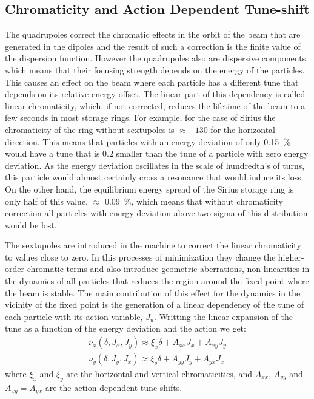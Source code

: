 \documentclass[
	12pt,				%
	openright,			%
	oneside,			%
	a4paper,		%
	chapter=TITLE,		%
	section=TITLE,		%
    brazil,				%
	english,			%
	sumario=tradicional,
	]{abntex2}
\begin{document}
    \subsection{Chromaticity and Action Dependent Tune-shift}

	The quadrupoles correct the chromatic effects in the orbit of the beam that are generated in the dipoles and the result of such a correction is the finite value of the dispersion function. However the quadrupoles also are dispersive components, which means that their focusing strength depends on the energy of the particles. This causes an effect on the beam where each particle has a different tune that depends on its relative energy offset. The linear part of this dependency is called linear chromaticity, which, if not corrected, reduces the lifetime of the beam to a few seconds in most storage rings. For example, for the case of Sirius the chromaticity of the ring without sextupoles is $\approx -130$ for the horizontal direction. This means that particles with an energy deviation of only \SI{0.15}{\percent} would have a tune that is \SI{0.2}{} smaller than the tune of a particle with zero energy deviation. As the energy deviation oscillates in the scale of hundredth's of turns, this particle would almost certainly cross a resonance that would induce its loss. On the other hand, the equilibrium energy spread of the Sirius storage ring is only half of this value, $\approx$ \SI{0.09}{\percent}, which means that without chromaticity correction all particles with energy deviation above two sigma of this distribution would be lost.

	The sextupoles are introduced in the machine to correct the linear chromaticity to values close to zero. In this processes of minimization they change the higher-order chromatic terms and also introduce geometric aberrations, non-linearities in the dynamics of all particles that reduces the region around the fixed point where the beam is stable. The main contribution of this effect for the dynamics in the vicinity of the fixed point is the generation of a linear dependency of the tune of each particle with its action variable, $J_u$. Writting the linear expansion of the tune as a function of the energy deviation and the action we get:
	\begin{align}
		\nu_x(\delta, J_x, J_y) \approx \xi_x \delta + A_{xx} J_x + A_{xy} J_y \\\nonumber
		\nu_y(\delta, J_y, J_x) \approx \xi_y \delta + A_{yy} J_y + A_{yx} J_x
	\end{align}
	where $\xi_x$ and $\xi_y$ are the horizontal and vertical chromaticities, and $A_{xx}$, $A_{yy}$ and $A_{xy}=A_{yx}$ are the action dependent tune-shifts.
\end{document}
